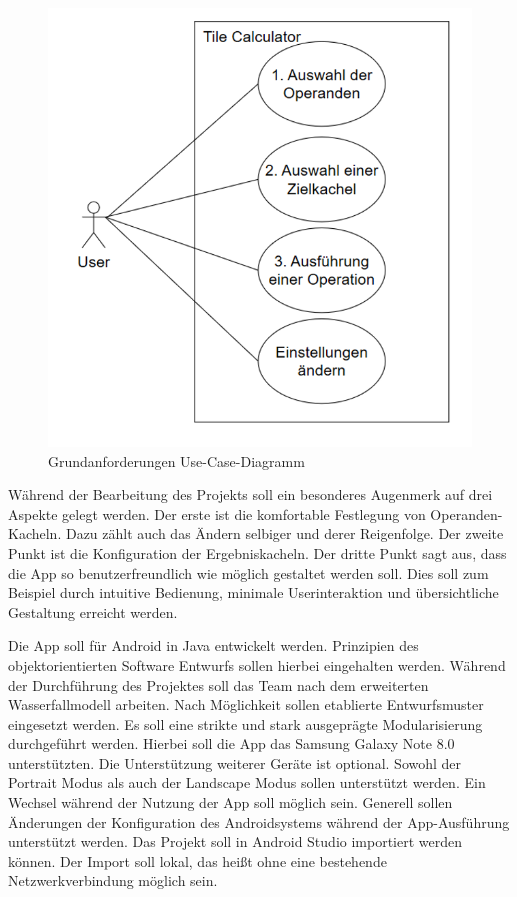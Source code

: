 \begin{figure}[h]
	\includegraphics[width=0.75\columnwidth]{img/funktionsumfang-grundanforderungen-use-case-diagramm}
	\caption[Grundanforderungen Use-Case-Diagramm]{Grundanforderungen Use-Case-Diagramm\footnotemark}
\end{figure}

Während der Bearbeitung des Projekts soll ein besonderes Augenmerk auf drei Aspekte gelegt werden. Der erste ist die komfortable Festlegung von Operanden-Kacheln. Dazu zählt auch das Ändern selbiger und derer Reigenfolge. Der zweite Punkt ist die Konfiguration der Ergebniskacheln. Der dritte Punkt sagt aus, dass die App so benutzerfreundlich wie möglich gestaltet werden soll. Dies soll zum Beispiel durch intuitive Bedienung, minimale Userinteraktion und übersichtliche Gestaltung erreicht werden. 

Die App soll für Android in Java entwickelt werden. Prinzipien des objektorientierten Software Entwurfs sollen hierbei eingehalten werden. Während der Durchführung des Projektes soll das Team nach dem erweiterten Wasserfallmodell arbeiten. Nach Möglichkeit sollen etablierte Entwurfsmuster eingesetzt werden. Es soll eine strikte und stark ausgeprägte Modularisierung durchgeführt werden. Hierbei soll die App das Samsung Galaxy Note 8.0 unterstützten. Die Unterstützung weiterer Geräte ist optional. Sowohl der Portrait Modus als auch der Landscape Modus sollen unterstützt werden. Ein Wechsel während der Nutzung der App soll möglich sein. Generell sollen Änderungen der Konfiguration des Androidsystems während der App-Ausführung unterstützt werden. Das Projekt soll in Android Studio importiert werden können. Der Import soll lokal, das heißt ohne eine bestehende Netzwerkverbindung möglich sein.

